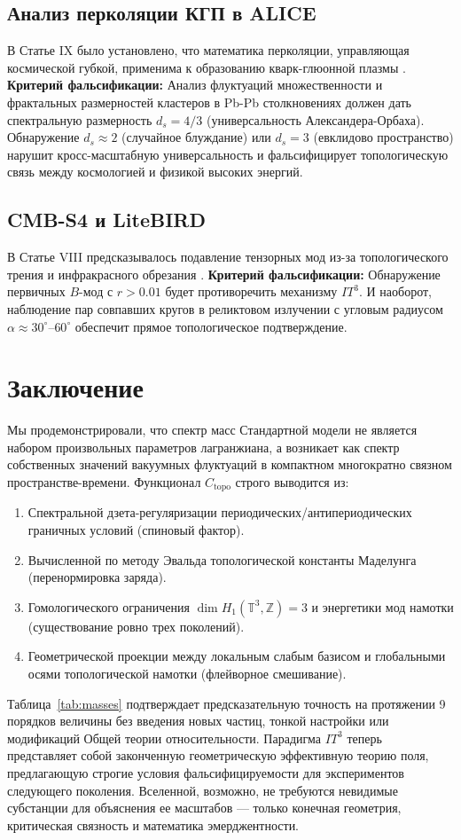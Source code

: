 \documentclass[12pt,a4paper]{article}
\begin{document}
\subsection{Анализ перколяции КГП в ALICE}
В Статье IX было установлено, что математика перколяции, управляющая космической губкой, применима к образованию кварк-глюонной плазмы \cite{PaperIX}. 
\textbf{Критерий фальсификации:} Анализ флуктуаций множественности и фрактальных размерностей кластеров в Pb-Pb столкновениях должен дать спектральную размерность $d_s = 4/3$ (универсальность Александера-Орбаха). Обнаружение $d_s \approx 2$ (случайное блуждание) или $d_s = 3$ (евклидово пространство) нарушит кросс-масштабную универсальность и фальсифицирует топологическую связь между космологией и физикой высоких энергий.

\subsection{CMB-S4 и LiteBIRD}
В Статье VIII предсказывалось подавление тензорных мод из-за топологического трения и инфракрасного обрезания \cite{PaperVIII}.
\textbf{Критерий фальсификации:} Обнаружение первичных $B$-мод с $r > 0.01$ будет противоречить механизму $IT^3$. И наоборот, наблюдение пар совпавших кругов в реликтовом излучении с угловым радиусом $\alpha \approx 30^\circ$--$60^\circ$ обеспечит прямое топологическое подтверждение.

\section{Заключение}
Мы продемонстрировали, что спектр масс Стандартной модели не является набором произвольных параметров лагранжиана, а возникает как спектр собственных значений вакуумных флуктуаций в компактном многократно связном пространстве-времени. Функционал $C_{\text{topo}}$ строго выводится из:
\begin{enumerate}
    \item Спектральной дзета-регуляризации периодических/антипериодических граничных условий (спиновый фактор).
    \item Вычисленной по методу Эвальда топологической константы Маделунга (перенормировка заряда).
    \item Гомологического ограничения $\dim H_1(\mathbb{T}^3,\mathbb{Z}) = 3$ и энергетики мод намотки (существование ровно трех поколений).
    \item Геометрической проекции между локальным слабым базисом и глобальными осями топологической намотки (флейворное смешивание).
\end{enumerate}
Таблица~\ref{tab:masses} подтверждает предсказательную точность на протяжении 9 порядков величины без введения новых частиц, тонкой настройки или модификаций Общей теории относительности. Парадигма $IT^3$ теперь представляет собой законченную геометрическую эффективную теорию поля, предлагающую строгие условия фальсифицируемости для экспериментов следующего поколения. Вселенной, возможно, не требуются невидимые субстанции для объяснения ее масштабов — только конечная геометрия, критическая связность и математика эмерджентности.
\end{document}
